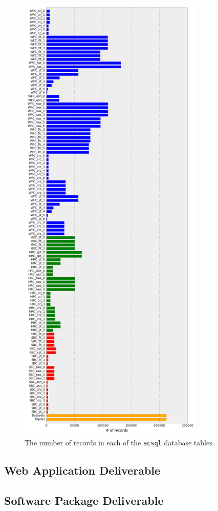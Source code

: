 \documentclass[10pt,journal,compsoc]{IEEEtran}
\begin{document}
\begin{figure}[!t]
\centering
\includegraphics[width=3.5in]{./figures/database_records.png}
\caption{The number of records in each of the \texttt{acsql} database tables.}
\label{fig1}
\end{figure}


\subsection{Web Application Deliverable}


\subsection{Software Package Deliverable}
\end{document}
